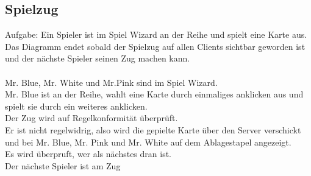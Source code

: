 \documentclass{article}
\begin{document}
	\subsection{Spielzug}
		Aufgabe: Ein Spieler ist im Spiel Wizard an der Reihe und spielt eine Karte aus.
		Das Diagramm endet sobald der Spielzug auf allen Clients sichtbar
		geworden ist und der nächste Spieler seinen Zug machen kann.\\
		\ \\
		Mr. Blue, Mr. White und Mr.Pink sind im Spiel Wizard. \\
		Mr. Blue ist an der Reihe, wahlt eine Karte durch einmaliges anklicken aus und spielt sie durch ein weiteres anklicken.\\
		Der Zug wird auf Regelkonformität überprüft.\\
		Er ist nicht regelwidrig, also wird die gepielte Karte über den Server verschickt und bei Mr. Blue, Mr. Pink und Mr. White auf dem 	Ablagestapel angezeigt. \\
		Es wird überpruft, wer als nächstes dran ist.\\
		Der nächste Spieler ist am Zug \\
\end{document}
